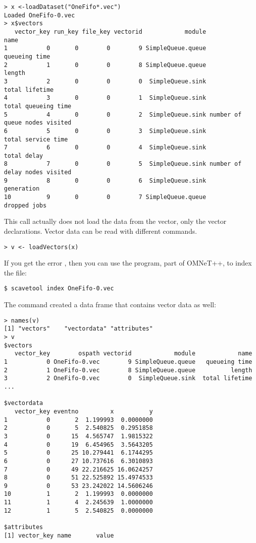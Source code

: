 \begin{verbatim}
> x <-loadDataset("OneFifo*.vec")
Loaded OneFifo-0.vec
> x$vectors
   vector_key run_key file_key vectorid            module                          name
1           0       0        0        9 SimpleQueue.queue                 queueing time
2           1       0        0        8 SimpleQueue.queue                        length
3           2       0        0        0  SimpleQueue.sink                total lifetime
4           3       0        0        1  SimpleQueue.sink           total queueing time
5           4       0        0        2  SimpleQueue.sink number of queue nodes visited
6           5       0        0        3  SimpleQueue.sink            total service time
7           6       0        0        4  SimpleQueue.sink                   total delay
8           7       0        0        5  SimpleQueue.sink number of delay nodes visited
9           8       0        0        6  SimpleQueue.sink                    generation
10          9       0        0        7 SimpleQueue.queue                  dropped jobs
\end{verbatim}

This call actually does not load the data from the vector, only the vector declarations. 
Vector data can be read with different commands.

\begin{verbatim}
> v <- loadVectors(x)
\end{verbatim}

If you get the error , then
you can use the  program, part of OMNeT++, to index the file: 

\begin{verbatim}
$ scavetool index OneFifo-0.vec
\end{verbatim}

The  command created a data frame that contains vector data as well:

\begin{verbatim}
> names(v)
[1] "vectors"    "vectordata" "attributes"
> v
$vectors
   vector_key        ospath vectorid            module            name
1           0 OneFifo-0.vec        9 SimpleQueue.queue   queueing time
2           1 OneFifo-0.vec        8 SimpleQueue.queue          length
3           2 OneFifo-0.vec        0  SimpleQueue.sink  total lifetime
...

$vectordata
   vector_key eventno         x          y
1           0       2  1.199993  0.0000000
2           0       5  2.540825  0.2951858
3           0      15  4.565747  1.9815322
4           0      19  6.454965  3.5643205
5           0      25 10.279441  6.1744295
6           0      27 10.737616  6.3010893
7           0      49 22.216625 16.0624257
8           0      51 22.525892 15.4974533
9           0      53 23.242022 14.5606246
10          1       2  1.199993  0.0000000
11          1       4  2.245639  1.0000000
12          1       5  2.540825  0.0000000

$attributes
[1] vector_key name       value     
\end{verbatim}

